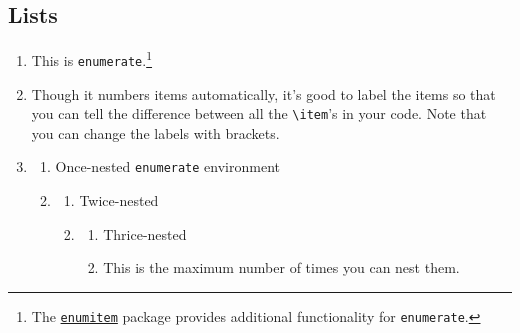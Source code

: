 \documentclass{article} 		%
\begin{document}
\subsection{Lists} \label{subsec:lists}
\begin{enumerate}
	\item[1.]
	This is \texttt{enumerate}.\footnote{
		The \href{https://ctan.org/pkg/enumitem}{\texttt{enumitem}} package provides additional functionality for \texttt{enumerate}.
	}
	
	\item[label \#2]
	Though it numbers items automatically, it's good to label the items so that you can tell the difference between all the \verb$\item$'s in your code. Note that you can change the labels with brackets. 
	
	\item[3.]
	\begin{enumerate}
		\item%
		Once-nested \texttt{enumerate} environment 
		
		\item%
			\begin{enumerate}
				\item%
				Twice-nested
				
				\item%
				\begin{enumerate}
					\item%
					Thrice-nested
					
					\item%
					This is the maximum number of times you can nest them. 
				\end{enumerate}
			\end{enumerate}

	\end{enumerate}
\end{enumerate}
\end{document}
